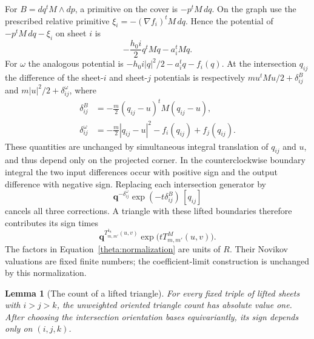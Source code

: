 \documentclass[11pt]{article}
\newtheorem{lemma}[theorem]{Lemma}
\theoremstyle{definition}
\theoremstyle{remark}
\numberwithin{equation}{section}
\begin{document}
For $B=dq^tM\wedge dp$, a primitive on the cover is $-p^tM\,dq$.
On the graph use the prescribed relative primitive
$\xi_i=-(\nabla f_i)^tM\,dq$.  Hence the potential of
$-p^tM\,dq-\xi_i$ on sheet $i$ is
\[
 -\frac{h_0i}{2}q^tMq-a_i^tMq.
\]
For $\omega$ the analogous potential is
$-h_0i|q|^2/2-a_i^tq-f_i(q)$.  At the intersection $q_{ij}$ the difference
of the sheet-$i$ and sheet-$j$ potentials is respectively
$mu^tMu/2+\delta^B_{ij}$ and $m|u|^2/2+\delta^\omega_{ij}$, where
\begin{equation}\label{theta:corner-corrections}
 \begin{split}
 \delta^B_{ij}&=-\frac m2(q_{ij}-u)^tM(q_{ij}-u),\\
 \delta^\omega_{ij}&=-\frac m2|q_{ij}-u|^2-f_i(q_{ij})+f_j(q_{ij}).
 \end{split}
\end{equation}
These quantities are unchanged by simultaneous integral translation of
$q_{ij}$ and $u$, and thus depend only on the projected corner.  In the
counterclockwise boundary integral the two input differences occur with
positive sign and the output difference with negative sign.  Replacing
each intersection generator by
\begin{equation}\label{theta:normalization}
 \mathbf q^{-\delta^\omega_{ij}}
       \exp(-t\delta^B_{ij})\, [q_{ij}]
\end{equation}
cancels all three corrections.  A triangle with these lifted boundaries
therefore contributes its sign times
\[
 \mathbf q^{T^{1_8}_{m,m'}(u,v)}
       \exp\bigl(tT^M_{m,m'}(u,v)\bigr).
\]
The factors in Equation~\eqref{theta:normalization} are units of $R$.
Their Novikov valuations are fixed finite numbers; the coefficient-limit
construction is unchanged by this normalization.

\begin{lemma}[The count of a lifted triangle]\label{theta:triangle-count}
For every fixed triple of lifted sheets with $i>j>k$, the unweighted
oriented triangle count has absolute value one.  After choosing the
intersection orientation bases equivariantly, its sign depends only on
$(i,j,k)$.
\end{lemma}
\end{document}
